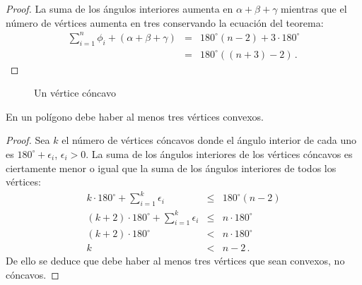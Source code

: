 \begin{proof}
La suma de los ángulos interiores aumenta en $\alpha+\beta+\gamma$ mientras que el número de vértices aumenta en tres conservando la ecuación del teorema:
\begin{eqnarray*}
\displaystyle\sum_{i=1}^n \phi_i + (\alpha + \beta + \gamma) &=& 180^\circ(n-2)+3\cdot 180^\circ\\
&=& 180^\circ((n+3)-2)\,.
\end{eqnarray*}
\end{proof}

\begin{figure}[t]
\begin{center}
\end{center}
\caption{Un vértice cóncavo}\label{f.museum.concave}
\end{figure}

\begin{theorem}\label{thm.convex}
En un polígono debe haber al menos tres vértices convexos.
\end{theorem}

\begin{proof}
Sea $k$ el número de vértices cóncavos donde el ángulo interior de cada uno es $180^\circ+\epsilon_i$, $\epsilon_i>0$. La suma de los ángulos interiores de los vértices cóncavos es ciertamente menor o igual que la suma de los ángulos interiores de todos los vértices:
\begin{eqnarray*}
k\cdot 180^\circ +\displaystyle\sum_{i=1}^{k}\epsilon_i &\leq& 180^\circ(n-2)\\
(k+2)\cdot 180^\circ +\displaystyle\sum_{i=1}^{k}\epsilon_i &\leq& n\cdot 180^\circ\\
(k+2)\cdot 180^\circ &<& n\cdot 180^\circ\\
k&<&n-2\,.
\end{eqnarray*}
De ello se deduce que debe haber al menos tres vértices que sean convexos, no cóncavos.
\end{proof}

